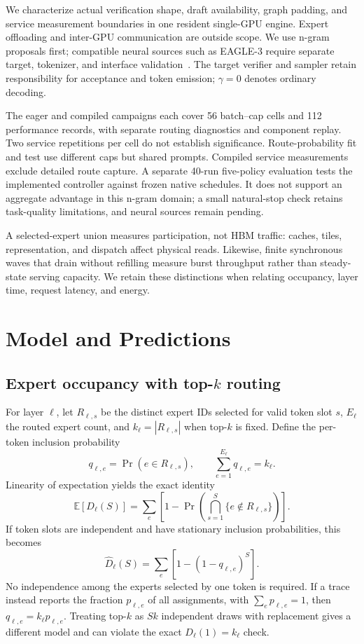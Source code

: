 \documentclass[conference,letterpaper]{IEEEtran}
\begin{document}
We characterize actual verification shape, draft availability, graph padding, and service measurement boundaries in one resident single-GPU engine. Expert offloading and inter-GPU communication are outside scope. We use n-gram proposals first; compatible neural sources such as EAGLE-3 require separate target, tokenizer, and interface validation~\cite{eagle3,eaglerepo}. The target verifier and sampler retain responsibility for acceptance and token emission; $\gamma=0$ denotes ordinary decoding.

The eager and compiled campaigns each cover 56 batch--cap cells and 112 performance records, with separate routing diagnostics and component replay. Two service repetitions per cell do not establish significance. Route-probability fit and test use different caps but shared prompts. Compiled service measurements exclude detailed route capture. A separate 40-run five-policy evaluation tests the implemented controller against frozen native schedules. It does not support an aggregate advantage in this n-gram domain; a small natural-stop check retains task-quality limitations, and neural sources remain pending.

A selected-expert union measures participation, not HBM traffic: caches, tiles, representation, and dispatch affect physical reads. Likewise, finite synchronous waves that drain without refilling measure burst throughput rather than steady-state serving capacity. We retain these distinctions when relating occupancy, layer time, request latency, and energy.

\section{Model and Predictions}
\subsection{Expert occupancy with top-\texorpdfstring{$k$}{k} routing}
For layer $\ell$, let $R_{\ell,s}$ be the distinct expert IDs selected for valid token slot $s$, $E_\ell$ the routed expert count, and $k_\ell=|R_{\ell,s}|$ when top-$k$ is fixed. Define the per-token inclusion probability
\begin{equation}
q_{\ell,e}=\Pr(e\in R_{\ell,s}),\qquad
\sum_{e=1}^{E_\ell}q_{\ell,e}=k_\ell.
\end{equation}
Linearity of expectation yields the exact identity
\begin{equation}
\mathbb E[D_\ell(S)] = \sum_e\left[1-\Pr\!\left(\bigcap_{s=1}^{S}\{e\notin R_{\ell,s}\}\right)\right].
\end{equation}
If token slots are independent and have stationary inclusion probabilities, this becomes
\begin{equation}\label{eq:d}
\widehat D_\ell(S)=\sum_e[1-(1-q_{\ell,e})^S].
\end{equation}
No independence among the experts selected by one token is required. If a trace instead reports the fraction $p_{\ell,e}$ of all assignments, with $\sum_e p_{\ell,e}=1$, then $q_{\ell,e}=k_\ell p_{\ell,e}$. Treating top-$k$ as $Sk$ independent draws with replacement gives a different model and can violate the exact $D_\ell(1)=k_\ell$ check.
\end{document}

